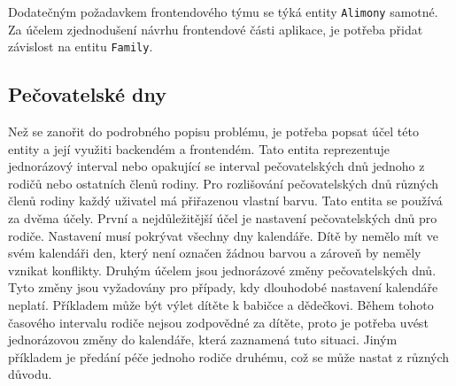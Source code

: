         Dodatečným požadavkem frontendového týmu se týká entity \texttt{Alimony} samotné. Za účelem zjednodušení návrhu frontendové části aplikace, je potřeba přidat závislost na entitu \texttt{Family}. %
        
    \subsection{Pečovatelské dny}\label{analyza:pozadavky:caredays}
        Než se zanořit do podrobného popisu problému, je potřeba popsat účel této entity a její využiti backendém a frontendém. Tato entita reprezentuje jednorázový interval nebo opakující se interval pečovatelských dnů jednoho z rodičů nebo ostatních členů rodiny. Pro rozlišování pečovatelských dnů různých členů rodiny každý uživatel má přiřazenou vlastní barvu. Tato entita se používá za dvěma účely. První a nejdůležitější účel je nastavení pečovatelských dnů pro rodiče. Nastavení musí pokrývat všechny dny kalendáře. Dítě by nemělo mít ve svém kalendáři den, který není označen žádnou barvou a zároveň by neměly vznikat konflikty. Druhým účelem jsou jednorázové změny pečovatelských dnů. Tyto změny jsou vyžadovány pro případy, kdy dlouhodobé nastavení kalendáře neplatí. Příkladem může být výlet dítěte k babičce a dědečkovi. Během tohoto časového intervalu rodiče nejsou zodpovědné za dítěte, proto je potřeba uvést jednorázovou změny do kalendáře, která zaznamená tuto situaci. Jiným příkladem je předání péče jednoho rodiče druhému, což se může nastat z různých důvodu.

